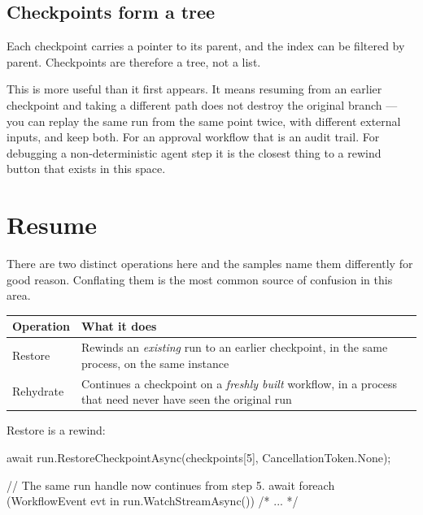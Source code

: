 \subsection{Checkpoints form a tree}

Each checkpoint carries a pointer to its parent, and the index can be filtered by
parent. Checkpoints are therefore a tree, not a list.

This is more useful than it first appears. It means resuming from an earlier
checkpoint and taking a different path does not destroy the original branch ---
you can replay the same run from the same point twice, with different external
inputs, and keep both. For an approval workflow that is an audit trail. For
debugging a non-deterministic agent step it is the closest thing to a rewind
button that exists in this space.

\section{Resume}
\label{sec:dur-resume}

There are two distinct operations here and the samples name them differently for
good reason. Conflating them is the most common source of confusion in this area.

\begin{center}
\small
\begin{tabularx}{\linewidth}{@{}lX@{}}
\toprule
\textbf{Operation} & \textbf{What it does} \\
\midrule
Restore & Rewinds an \emph{existing} run to an earlier checkpoint, in the same
process, on the same instance \\[4pt]
Rehydrate & Continues a checkpoint on a \emph{freshly built} workflow, in a
process that need never have seen the original run \\
\bottomrule
\end{tabularx}
\end{center}

\noindent
Restore is a rewind:

\begin{csharp}[caption={Rewinding a live run}, label={lst:dur-restore}]
await run.RestoreCheckpointAsync(checkpoints[5], CancellationToken.None);

// The same run handle now continues from step 5.
await foreach (WorkflowEvent evt in run.WatchStreamAsync()) { /* ... */ }
\end{csharp}

